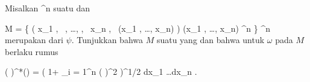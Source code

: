 {

Misalkan
\maabbdisp {\psi} {\R^n } {\R
} {}
suatu
dan

\mavergleichskettedisphandlinks
{\vergleichskettedisphandlinks
{M
}
{ =} { \left\{  \left(  x_1   , \,   , \ldots ,  , \,   x_n , \,   \psi(x_1 , \ldots , x_n)                \right)   \mid  (x_1 , \ldots , x_n) \in \R^n         \right\}
}
{ \subseteq} { \R^n \times \R
}
{ } {
}
{ } {
}
}
{}{}{}
merupakan
dari $\psi$. Tunjukkan bahwa $M$ suatu
yang
dan bahwa untuk
$\omega$ pada $M$ berlaku rumus

\mavergleichskettedisp
{\vergleichskette
{ ( \times \psi)^*(\omega)
}
{ =} { \left(  1+ \sum_{i = 1}^n \left(  {  }  \right)^2  \right)^{1/2} dx_1 \wedge \ldots \wedge dx_n
}
{ } {
}
{ } {
}
{ } {
}
}
{}{}{.}

}
